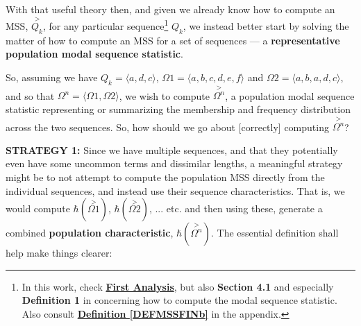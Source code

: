 \documentclass[a4paper, 18pt]{book} %
\begin{document}
With that useful theory then, and given we already know how to compute an MSS, $\overset{>}{Q_k}$, for any particular sequence\footnote{In this work, check \textbf{\hyperref[SECFANAL]{First Analysis}}, but also \textbf{Section 4.1} and especially \textbf{Definition 1} in \cite{transformatics} concerning how to compute the modal sequence statistic. Also consult \textbf{\hyperref[DEFMSSFINb]{Definition \ref{DEFMSSFINb}}} in the appendix.} $Q_k$, we instead better start by solving the matter of how to compute an MSS for a set of sequences --- a \textbf{representative population modal sequence statistic}.


So, assuming we have $Q_k = \langle a, d, c \rangle$, $\Omega1 = \langle a, b, c, d, e, f \rangle$ and $\Omega2 = \langle a, b, a, d, c \rangle$, and so that $\Omega^n = \langle \Omega1, \Omega2 \rangle$, we wish to compute $\overset{>}{\Omega^n}$, a population modal sequence statistic representing or summarizing the membership and frequency distribution across the two sequences. So, how should we go about [correctly] computing $\overset{>}{\Omega^n}$?

\vspace{2em}

\textbf{STRATEGY 1:} Since we have multiple sequences, and that they potentially even have some uncommon terms and dissimilar lengths, a meaningful strategy might be to not attempt to compute the population MSS directly from the individual sequences, and instead use their sequence characteristics. That is, we would compute $\hbar(\overset{>}{\Omega1})$, $\hbar(\overset{>}{\Omega2})$, ... etc. and then using these, generate a combined \textbf{population characteristic}, $\hbar(\overset{>}{\Omega^n})$. The essential definition shall help make things clearer:
\end{document}
